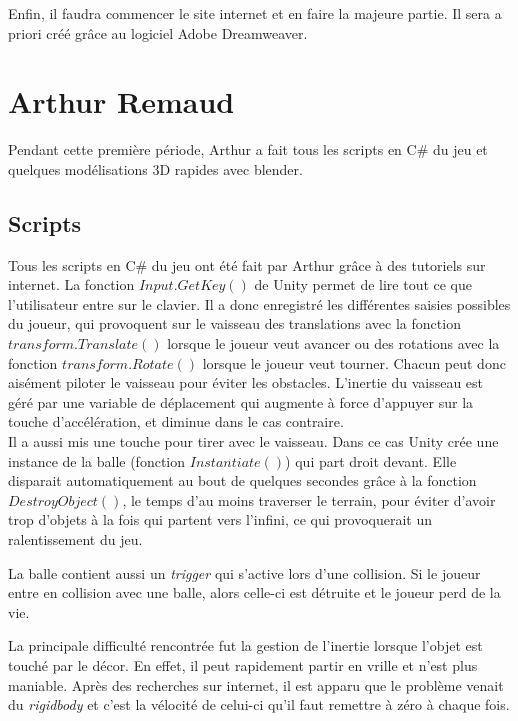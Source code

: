 \documentclass[10pt, titlepage]{report}
\begin{document}
Enfin, il faudra commencer le site internet et en faire la majeure partie. Il sera a priori créé grâce au logiciel Adobe Dreamweaver.


\section{Arthur Remaud}
Pendant cette première période, Arthur a fait tous les scripts en C\# du jeu et quelques modélisations 3D rapides avec blender.

\subsection{Scripts}

Tous les scripts en C\# du jeu ont été fait par Arthur grâce à des tutoriels sur internet. La fonction $Input.GetKey()$ de Unity permet de lire tout ce que l'utilisateur entre sur le clavier. Il a donc enregistré les différentes saisies possibles du joueur, qui provoquent sur le vaisseau des translations avec la fonction $transform.Translate()$ lorsque le joueur veut avancer ou des rotations avec la fonction $transform.Rotate()$ lorsque le joueur veut tourner. Chacun peut donc aisément piloter le vaisseau pour éviter les obstacles. L'inertie du vaisseau est géré par une variable de déplacement qui augmente à force d'appuyer sur la touche d'accélération, et diminue dans le cas contraire.\\

Il a aussi mis une touche pour tirer avec le vaisseau. Dans ce cas Unity crée une instance de la balle (fonction $Instantiate()$) qui part droit devant. Elle disparait automatiquement au bout de quelques secondes grâce à la fonction $DestroyObject()$, le temps d'au moins traverser le terrain, pour éviter d'avoir trop d'objets à la fois qui partent vers l'infini, ce qui provoquerait un ralentissement du jeu.

La balle contient aussi un \textit{trigger} qui s'active lors d'une collision. Si le joueur entre en collision avec une balle, alors celle-ci est détruite et le joueur perd de la vie.

La principale difficulté rencontrée fut la gestion de l'inertie lorsque l'objet est touché par le décor. En effet, il peut rapidement partir en vrille et n'est plus maniable. Après des recherches sur internet, il est apparu que le problème venait du \textit{rigidbody} et c'est la vélocité de celui-ci qu'il faut remettre à zéro à chaque fois.\\
\end{document}
